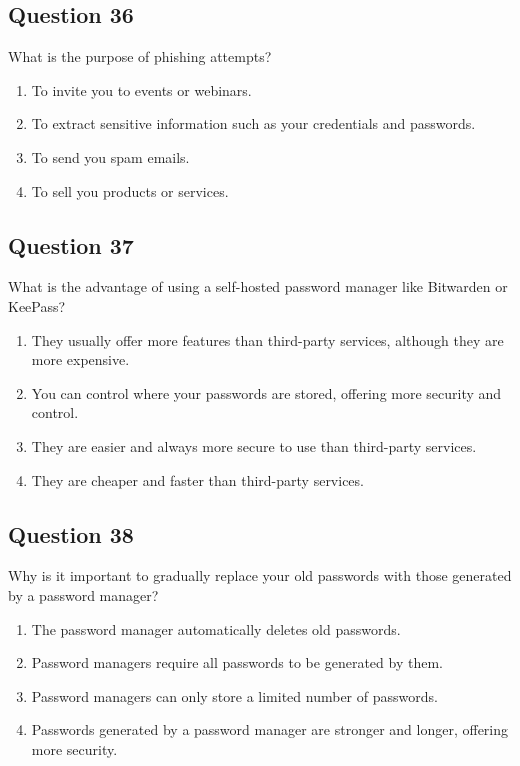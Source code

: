 \documentclass[12pt,a4paper]{article}
\begin{document}
\bigskip


\subsection*{Question 36}
What is the purpose of phishing attempts?

\begin{enumerate}[label=\Alph*., leftmargin=*]
\item To invite you to events or webinars.
\item To extract sensitive information such as your credentials and passwords.
\item To send you spam emails.
\item To sell you products or services.
\end{enumerate}

\bigskip


\subsection*{Question 37}
What is the advantage of using a self-hosted password manager like Bitwarden or KeePass?

\begin{enumerate}[label=\Alph*., leftmargin=*]
\item They usually offer more features than third-party services, although they are more expensive.
\item You can control where your passwords are stored, offering more security and control.
\item They are easier and always more secure to use than third-party services.
\item They are cheaper and faster than third-party services.
\end{enumerate}

\bigskip


\subsection*{Question 38}
Why is it important to gradually replace your old passwords with those generated by a password manager?

\begin{enumerate}[label=\Alph*., leftmargin=*]
\item The password manager automatically deletes old passwords.
\item Password managers require all passwords to be generated by them.
\item Password managers can only store a limited number of passwords.
\item Passwords generated by a password manager are stronger and longer, offering more security.
\end{enumerate}
\end{document}
